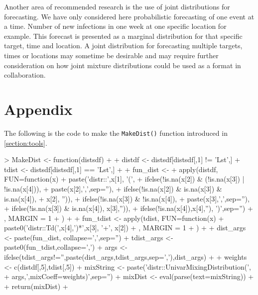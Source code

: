 \documentclass[11pt,notitlepage]{isuthesis}
\begin{document}
Another area of recommended research is the use of joint distributions for 
forecasting. We have only considered here probabilistic forecasting of one 
event at a time. Number of new infections in one week at one specific location
for example. This forecast is presented as a marginal distribution for that 
specific target, time and location. A joint distribution for forecasting 
multiple targets, times or locations may sometime be desirable and may require
further consideration on how joint mixture distributions could be used as a 
format in collaboration.






















% 
% 
% 
% 
% 
%





\section{Appendix}

The following is the code to make the \texttt{MakeDist()} function introduced 
in \ref{section:tools}.
\begin{Schunk}
\begin{Sinput}
> MakeDist <- function(distsdf){
+   
+   distdf <- distsdf[distsdf[,1] != 'Lst',]
+   tdist <- distsdf[distsdf[,1] == 'Lst',]
+   
+   fun_dist <- 
+     apply(distdf, FUN=function(x) {
+       paste('distr::',x[1], '(', 
+             ifelse(!is.na(x[2]) & (!is.na(x[3]) | !is.na(x[4])),
+                    paste(x[2],',',sep=''),
+                    ifelse(!is.na(x[2]) & is.na(x[3]) & is.na(x[4]),
+                           x[2], '')), 
+             ifelse(!is.na(x[3]) & !is.na(x[4]),
+                    paste(x[3],',',sep=''),
+                    ifelse(!is.na(x[3]) & is.na(x[4]), x[3],'')), 
+             ifelse(!is.na(x[4]),x[4],''), ')',sep='')
+     }, MARGIN = 1
+     )
+   
+   fun_tdist <- apply(tdist, FUN=function(x) {
+     paste0('distr::Td(',x[4],')*',x[3], '+', x[2])
+   }, MARGIN = 1
+   )
+   
+   dist_args <- paste(fun_dist, collapse=',',sep='')
+   tdist_args <- paste0(fun_tdist,collapse=',')
+   args <- ifelse(tdist_args!='',paste(dist_args,tdist_args,sep=','),dist_args)
+   
+   weights <- c(distdf[,5],tdist[,5])
+   mixString <- paste('distr::UnivarMixingDistribution(',
+                      args,',mixCoeff=weights)',sep='')
+   mixDist <- eval(parse(text=mixString))
+   
+   return(mixDist)
+ }
\end{Sinput}
\end{Schunk}
\end{document}
